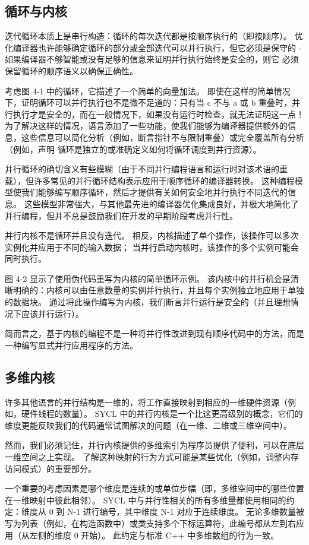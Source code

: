 \subsection{循环与内核}
迭代循环本质上是串行构造：循环的每次迭代都是按顺序执行的（即按顺序）。 优化编译器也许能够确定循环的部分或全部迭代可以并行执行，但它必须是保守的 - 如果编译器不够智能或没有足够的信息来证明并行执行始终是安全的，则它 必须保留循环的顺序语义以确保正确性。

考虑图 4-1 中的循环，它描述了一个简单的向量加法。 即使在这样的简单情况下，证明循环可以并行执行也不是微不足道的：只有当 c 不与 a 或 b 重叠时，并行执行才是安全的，而在一般情况下，如果没有运行时检查，就无法证明这一点！ 为了解决这样的情况，语言添加了一些功能，使我们能够为编译器提供额外的信息，这些信息可以简化分析（例如，断言指针不与限制重叠）或完全覆盖所有分析（例如，声明 循环是独立的或准确定义如何将循环调度到并行资源）。

并行循环的确切含义有些模糊（由于不同并行编程语言和运行时对该术语的重载），但许多常见的并行循环结构表示应用于顺序循环的编译器转换。 这种编程模型使我们能够编写顺序循环，然后才提供有关如何安全地并行执行不同迭代的信息。 这些模型非常强大，与其他最先进的编译器优化集成良好，并极大地简化了并行编程，但并不总是鼓励我们在开发的早期阶段考虑并行性。

并行内核不是循环并且没有迭代。 相反，内核描述了单个操作，该操作可以多次实例化并应用于不同的输入数据； 当并行启动内核时，该操作的多个实例可能会同时执行。

图 4-2 显示了使用伪代码重写为内核的简单循环示例。 该内核中的并行机会是清晰明确的：内核可以由任意数量的实例并行执行，并且每个实例独立地应用于单独的数据块。 通过将此操作编写为内核，我们断言并行运行是安全的（并且理想情况下应该并行运行）。

简而言之，基于内核的编程不是一种将并行性改进到现有顺序代码中的方法，而是一种编写显式并行应用程序的方法。

\subsection{多维内核}
许多其他语言的并行结构是一维的，将工作直接映射到相应的一维硬件资源（例如，硬件线程的数量）。 SYCL 中的并行内核是一个比这更高级别的概念，它们的维度更能反映我们的代码通常试图解决的问题（在一维、二维或三维空间中）。

然而，我们必须记住，并行内核提供的多维索引为程序员提供了便利，可以在底层一维空间之上实现。 了解这种映射的行为方式可能是某些优化（例如，调整内存访问模式）的重要部分。

一个重要的考虑因素是哪个维度是连续的或单位步幅（即，多维空间中的哪些位置在一维映射中彼此相邻）。 SYCL 中与并行性相关的所有多维量都使用相同的约定：维度从 0 到 N-1 进行编号，其中维度 N-1 对应于连续维度。 无论多维数量被写为列表（例如，在构造函数中）或类支持多个下标运算符，此编号都从左到右应用（从左侧的维度 0 开始）。 此约定与标准 C++ 中多维数组的行为一致。


